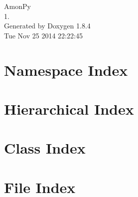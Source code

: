 \documentclass[twoside]{book}
\newcommand{\clearemptydoublepage}{%
  \newpage{\pagestyle{empty}\cleardoublepage}%
}
\begin{document}
\hypersetup{pageanchor=false}
\begin{titlepage}
\vspace*{7cm}
\begin{center}%
{\Large Amon\-Py \\[1ex]\large 1. }\\
\vspace*{1cm}
{\large Generated by Doxygen 1.8.4}\\
\vspace*{0.5cm}
{\small Tue Nov 25 2014 22:22:45}\\
\end{center}
\end{titlepage}
\clearemptydoublepage
\tableofcontents
\clearemptydoublepage
{}
\hypersetup{pageanchor=true}

\chapter{Namespace Index}

\chapter{Hierarchical Index}

\chapter{Class Index}

\chapter{File Index}

\end{document}
